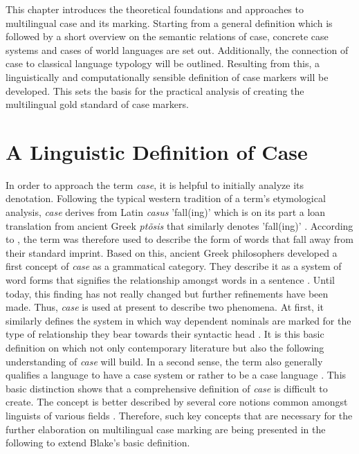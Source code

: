 \documentclass[11pt,a4paper,twoside,openright]{scrbook}
\begin{document}
This chapter introduces the theoretical foundations and approaches to multilingual case and its marking. Starting from a general definition which is followed by a short overview on the semantic relations of case, concrete case systems and cases of world languages are set out. Additionally, the connection of case to classical language typology will be outlined. Resulting from this, a linguistically and computationally sensible definition of case markers will be developed. This sets the basis for the practical analysis of creating the multilingual gold standard of case markers.



\section{A Linguistic Definition of Case}

In order to approach the term \textit{case}, it is helpful to initially analyze its denotation. Following the typical western tradition of a term's etymological analysis, \textit{case} derives from Latin \textit{casus} 'fall(ing)' which is on its part a loan translation from ancient Greek \textit{ptõsis} that similarly denotes 'fall(ing)' \citep{haspelmath2012hbocas}. According to \citet{blake1994case}, the term was therefore used to describe the form of words that fall away from their standard imprint. Based on this, ancient Greek philosophers developed a first concept of \textit{case} as a grammatical category. They describe it as a system of word forms that signifies the relationship amongst words in a sentence \citep{blake2012hbocas}. Until today, this finding has not really changed but further refinements have been made. Thus, \textit{case} is used at present to describe two phenomena. At first, it similarly defines the system in which way dependent nominals are marked for the type of relationship they bear towards their syntactic head \citep{blake1994case}. It is this basic definition on which not only contemporary literature but also the following understanding of \textit{case} will build. In a second sense, the term also generally qualifies a language to have a case system or rather to be a case language \citep{haspelmath2012hbocas}. This basic distinction shows that a comprehensive definition of \textit{case} is difficult to create. The concept is better described by several core notions common amongst linguists of various fields \citep{butt2006case}. Therefore, such key concepts that are necessary for the further elaboration on multilingual case marking are being presented in the following to extend Blake's basic definition. 
\end{document}
